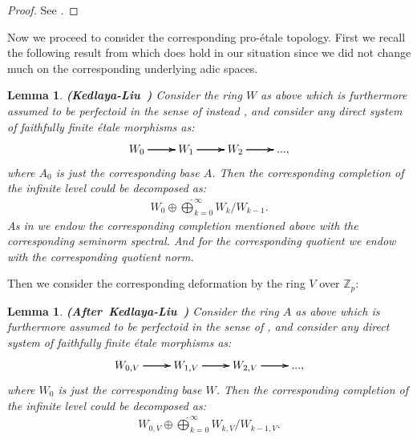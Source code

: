 \documentclass[12pt]{amsart}
\newtheorem{lemma}[theorem]{Lemma}
\theoremstyle{definition}
\numberwithin{equation}{section}
\begin{document}
\begin{proof}
See \cite[Proposition 3.4.3]{KL2}.	
\end{proof}


\indent Now we proceed to consider the corresponding pro-\'etale topology. First we recall the following result from \cite[Lemma 3.4.4]{KL2} which does hold in our situation since we did not change much on the corresponding underlying adic spaces.


\begin{lemma}  \mbox{\bf{(Kedlaya-Liu \cite[Lemma 3.4.4]{KL2})}}
Consider the ring $W$ as above which is furthermore assumed to be perfectoid in the sense of instead \cite[Definition 2.1.1]{Ked1}, and consider any direct system of faithfully finite \'etale morphisms as:
\[
\xymatrix@C+0pc@R+0pc{
W_0 \ar[r] \ar[r] \ar[r] &W_1 \ar[r] \ar[r] \ar[r] &W_2  \ar[r] \ar[r] \ar[r] &...,   
}
\]	
where $A_0$ is just the corresponding base $A$. Then the corresponding completion of the infinite level could be decomposed as:
\begin{align}
W_0\oplus\widehat{\bigoplus}_{k=0}^\infty W_k/W_{k-1}.	
\end{align}
As in \cite[Lemma 3.4.4]{KL2} we endow the corresponding completion mentioned above with the corresponding seminorm spectral. And for the corresponding quotient we endow with the corresponding quotient norm.
\end{lemma}



\indent Then we consider the corresponding deformation by the ring $V$ over $\mathbb{Z}_p$:


\begin{lemma}  \mbox{\bf{(After Kedlaya-Liu \cite[Lemma 3.4.4]{KL2})}}
Consider the ring $A$ as above which is furthermore assumed to be perfectoid in the sense of \cite[Definition 2.1.1]{Ked1}, and consider any direct system of faithfully finite \'etale morphisms as:
\[
\xymatrix@C+0pc@R+0pc{
W_{0,V} \ar[r] \ar[r] \ar[r] &W_{1,V} \ar[r] \ar[r] \ar[r] &W_{2,V}  \ar[r] \ar[r] \ar[r] &..., 
}  
\]	
where $W_0$ is just the corresponding base $W$. Then the corresponding completion of the infinite level could be decomposed as:
\begin{align}
W_{0,V}\oplus\widehat{\bigoplus}_{k=0}^\infty W_{k,V}/W_{k-1,V}.	
\end{align}
\end{lemma}

\
\end{document}
